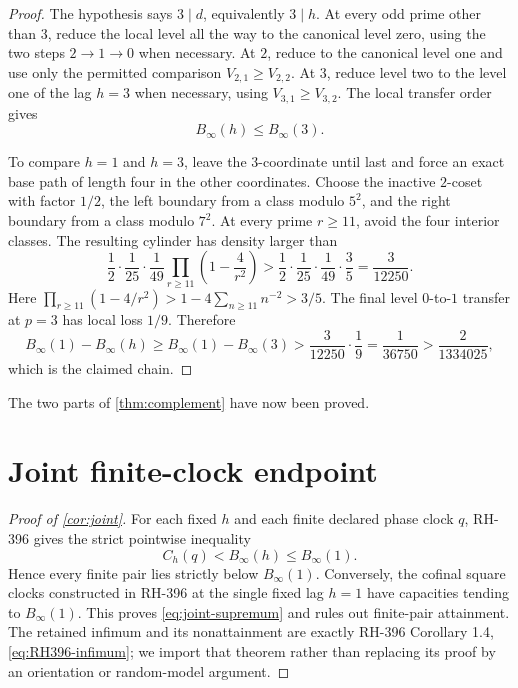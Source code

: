 \documentclass[12pt,a4paper]{article}
\theoremstyle{definition}
\newcommand{\Bin}{B_\infty}
\begin{document}
\begin{proof}
The hypothesis says \(3\mid d\), equivalently \(3\mid h\).  At every odd
prime other than \(3\), reduce the local level all the way to the canonical
level zero, using the two steps \(2\to1\to0\) when necessary.  At \(2\),
reduce to the canonical level one and use only the permitted comparison
\(V_{2,1}\geq V_{2,2}\).  At \(3\), reduce level two to the level one of
the lag \(h=3\) when necessary, using \(V_{3,1}\geq V_{3,2}\).
The local transfer order gives
\[
 \Bin(h)\leq\Bin(3).
\]

To compare \(h=1\) and \(h=3\), leave the \(3\)-coordinate until last and
force an exact base path of length four in the other coordinates.  Choose the
inactive \(2\)-coset with factor \(1/2\), the left boundary from a class
modulo \(5^2\), and the right boundary from a class modulo \(7^2\).  At every
prime \(r\geq11\), avoid the four interior classes.  The resulting cylinder
has density larger than
\[
 \frac12\cdot\frac1{25}\cdot\frac1{49}
 \prod_{r\geq11}\left(1-\frac4{r^2}\right)
 >\frac12\cdot\frac1{25}\cdot\frac1{49}\cdot\frac35
 =\frac3{12250}.
\]
Here
\(\prod_{r\geq11}(1-4/r^2)>1-4\sum_{n\geq11}n^{-2}>3/5\).
The final level \(0\)-to-\(1\) transfer at \(p=3\) has local loss \(1/9\).
Therefore
\[
 \Bin(1)-\Bin(h)\geq\Bin(1)-\Bin(3)
 >\frac3{12250}\cdot\frac19
 =\frac1{36750}>\frac2{1334025},
\]
which is the claimed chain.
\end{proof}

The two parts of \cref{thm:complement} have now been proved.

\section{Joint finite-clock endpoint}

\begin{proof}[Proof of \cref{cor:joint}]
For each fixed \(h\) and each finite declared phase clock \(q\), RH-396 gives
the strict pointwise inequality
\[
 C_h(q)<\Bin(h)\leq\Bin(1).
\]
Hence every finite pair lies strictly below \(\Bin(1)\).  Conversely, the
cofinal square clocks constructed in RH-396 at the single fixed lag \(h=1\)
have capacities tending to \(\Bin(1)\).  This proves
\eqref{eq:joint-supremum} and rules out finite-pair attainment.  The retained
infimum and its nonattainment are exactly RH-396 Corollary 1.4,
\eqref{eq:RH396-infimum}; we import that theorem rather than replacing its
proof by an orientation or random-model argument.
\end{proof}
\end{document}
